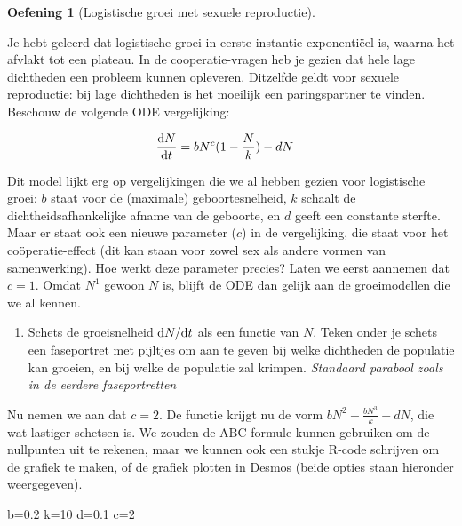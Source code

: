 \documentclass[
  a4paper,
]{scrbook}
\newenvironment{Shaded}{\begin{snugshade}}{\end{snugshade}}
\newcommand{\DecValTok}[1]{\textcolor[rgb]{0.68,0.00,0.00}{#1}}
\newcommand{\FloatTok}[1]{\textcolor[rgb]{0.68,0.00,0.00}{#1}}
\newcommand{\NormalTok}[1]{\textcolor[rgb]{0.00,0.23,0.31}{#1}}
\newcommand{\OtherTok}[1]{\textcolor[rgb]{0.00,0.23,0.31}{#1}}
\providecommand{\tightlist}{%
  \setlength{\itemsep}{0pt}\setlength{\parskip}{0pt}}\usepackage{longtable,booktabs,array}
\theoremstyle{definition}
\newtheorem{exercise}{Oefening}[chapter]
\theoremstyle{remark}
\begin{document}
\begin{exercise}[Logistische groei met sexuele
reproductie]\protect\hypertarget{exr-loggroeisex}{}\label{exr-loggroeisex}

Je hebt geleerd dat logistische groei in eerste instantie exponentiëel
is, waarna het afvlakt tot een plateau. In de cooperatie-vragen heb je
gezien dat hele lage dichtheden een probleem kunnen opleveren. Ditzelfde
geldt voor sexuele reproductie: bij lage dichtheden is het moeilijk een
paringspartner te vinden. Beschouw de volgende ODE vergelijking:

\begin{align}
    \mathchoice{\frac{\mathrm{d}N}
{\mathrm{d}t}}{\mathrm{d}N/\mathrm{d}t}
{\mathrm{d}N/\mathrm{d}t}
{\mathrm{d}N/\mathrm{d}t} &= bN^c(1-\frac{N}{k}) - dN
\end{align}

Dit model lijkt erg op vergelijkingen die we al hebben gezien voor
logistische groei: \(b\) staat voor de (maximale) geboortesnelheid,
\(k\) schaalt de dichtheidsafhankelijke afname van de geboorte, en \(d\)
geeft een constante sterfte. Maar er staat ook een nieuwe parameter
(\(c\)) in de vergelijking, die staat voor het coöperatie-effect (dit
kan staan voor zowel sex als andere vormen van samenwerking). Hoe werkt
deze parameter precies? Laten we eerst aannemen dat \(c=1\). Omdat
\(N^1\) gewoon \(N\) is, blijft de ODE dan gelijk aan de groeimodellen
die we al kennen.

\begin{enumerate}
\def\labelenumi{\alph{enumi}.}
\tightlist
\item
  Schets de groeisnelheid \(\mathchoice{\frac{\mathrm{d}N}
  {\mathrm{d}t}}{\mathrm{d}N/\mathrm{d}t}
  {\mathrm{d}N/\mathrm{d}t}
  {\mathrm{d}N/\mathrm{d}t}\) als een functie van \(N\). Teken onder je
  schets een faseportret met pijltjes om aan te geven bij welke
  dichtheden de populatie kan groeien, en bij welke de populatie zal
  krimpen. \emph{Standaard parabool zoals in de eerdere faseportretten }
\end{enumerate}

Nu nemen we aan dat \(c=2\). De functie krijgt nu de vorm
\(bN^2 - \frac{bN^3}{k} - dN\), die wat lastiger schetsen is. We zouden
de ABC-formule kunnen gebruiken om de nullpunten uit te rekenen, maar we
kunnen ook een stukje R-code schrijven om de grafiek te maken, of de
grafiek plotten in Desmos (beide opties staan hieronder weergegeven).

\begin{Shaded}
\begin{Highlighting}[]
\NormalTok{b}\OtherTok{=}\FloatTok{0.2}
\NormalTok{k}\OtherTok{=}\DecValTok{10}
\NormalTok{d}\OtherTok{=}\FloatTok{0.1}
\NormalTok{c}\OtherTok{=}\DecValTok{2}


\end{Highlighting}
\end{Shaded}
\end{exercise}
\end{document}
